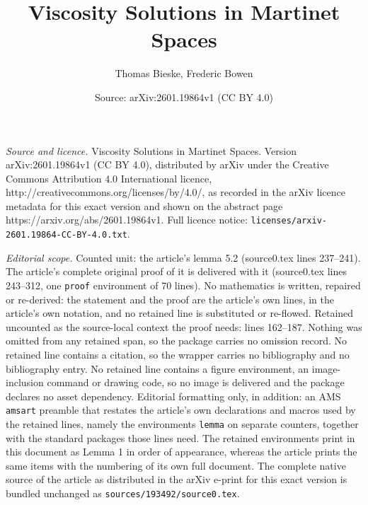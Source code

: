 \documentclass[10pt,a4paper]{amsart}
\title{Viscosity Solutions in Martinet Spaces}
\author{Thomas Bieske, Frederic Bowen}
\date{Source: arXiv:2601.19864v1 (CC BY 4.0)}
\begin{document}
\maketitle

\noindent\emph{Source and licence.} Viscosity Solutions in Martinet Spaces. Version arXiv:2601.19864v1 (CC BY 4.0), distributed by arXiv under the Creative Commons Attribution 4.0 International licence, http://creativecommons.org/licenses/by/4.0/, as recorded in the arXiv licence metadata for this exact version and shown on the abstract page https://arxiv.org/abs/2601.19864v1. Full licence notice: \texttt{licenses/arxiv-2601.19864-CC-BY-4.0.txt}.\par\smallskip

\noindent\textit{Editorial scope.} Counted unit: the article's lemma 5.2 (source0.tex lines 237--241). The article's complete original proof of it is delivered with it (source0.tex lines 243--312, one \texttt{proof} environment of 70 lines). No mathematics is written, repaired or re-derived: the statement and the proof are the article's own lines, in the article's own notation, and no retained line is substituted or re-flowed.  Retained uncounted as the source-local context the proof needs: lines 162--187.  Nothing was omitted from any retained span, so the package carries no omission record.  No retained line contains a citation, so the wrapper carries no bibliography and no bibliography entry.  No retained line contains a figure environment, an image-inclusion command or drawing code, so no image is delivered and the package declares no asset dependency.  Editorial formatting only, in addition: an AMS \texttt{amsart} preamble that restates the article's own declarations and macros used by the retained lines, namely the environments \texttt{lemma} on separate counters, together with the standard packages those lines need.  The retained environments print in this document as Lemma 1 in order of appearance, whereas the article prints the same items with the numbering of its own full document.  The complete native source of the article as distributed in the arXiv e-print for this exact version is bundled unchanged as \texttt{sources/193492/source0.tex}.
\end{document}
